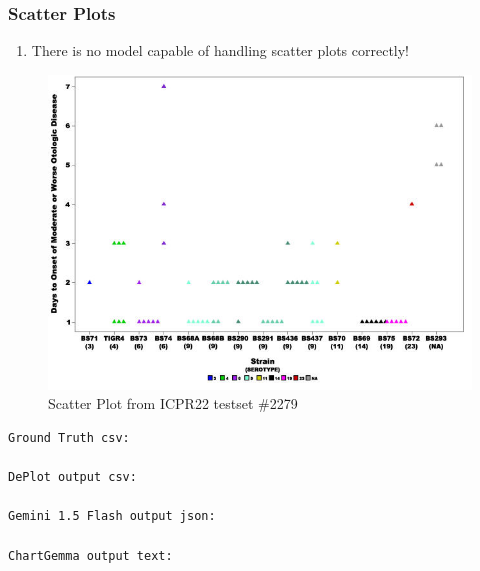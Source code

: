 \documentclass[
	letterpaper, %
]{jdf}
\begin{document}

\subsubsection{Scatter Plots}\label{sssect:scatter}
\begin{enumerate}
         \item There is no model capable of handling scatter plots correctly!
          \end{enumerate}
          \begin{figure}
               \includegraphics{test-sample/icpr22/images/scatter/PMC2279396___g002.jpg}
               \caption{Scatter Plot from ICPR22 testset \#2279}
               \label{fig:icpr22-scatter-2279}
                \end{figure}
\begin{verbatim}
Ground Truth csv:

DePlot output csv:

Gemini 1.5 Flash output json:

ChartGemma output text:

\end{verbatim}
\end{document}
